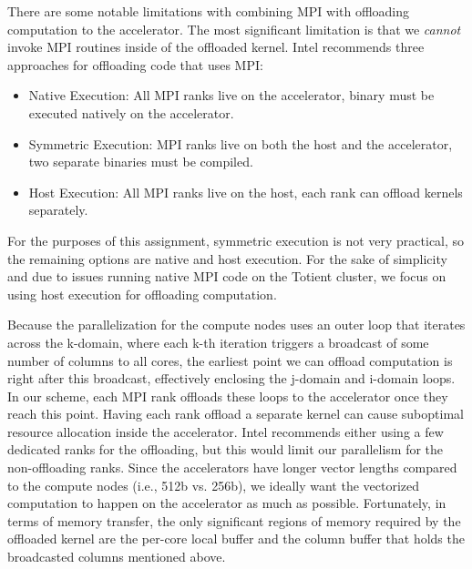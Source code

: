 There are some notable limitations with combining MPI with offloading
computation to the accelerator. The most significant limitation is that
we \emph{cannot} invoke MPI routines inside of the offloaded
kernel. Intel recommends three approaches for offloading code that uses
MPI:

\begin{itemize}
  \item Native Execution: All MPI ranks live on the accelerator, binary
    must be executed natively on the accelerator.
  \item Symmetric Execution: MPI ranks live on both the host and the
    accelerator, two separate binaries must be compiled.
  \item Host Execution: All MPI ranks live on the host, each rank can
    offload kernels separately.
\end{itemize}

For the purposes of this assignment, symmetric execution is not very
practical, so the remaining options are native and host execution. For
the sake of simplicity and due to issues running native MPI code on the
Totient cluster, we focus on using host execution for offloading
computation.

Because the parallelization for the compute nodes uses an outer loop that
iterates across the k-domain, where each k-th iteration triggers a
broadcast of some number of columns to all cores, the earliest point we
can offload computation is right after this broadcast, effectively
enclosing the j-domain and i-domain loops. In our scheme, each MPI rank
offloads these loops to the accelerator once they reach this
point. Having each rank offload a separate kernel can cause suboptimal
resource allocation inside the accelerator. Intel recommends either using
a few dedicated ranks for the offloading, but this would limit our
parallelism for the non-offloading ranks. Since the accelerators have
longer vector lengths compared to the compute nodes (i.e., 512b
vs. 256b), we ideally want the vectorized computation to happen on the
accelerator as much as possible. Fortunately, in terms of memory
transfer, the only significant regions of memory required by the
offloaded kernel are the per-core local buffer and the column buffer that
holds the broadcasted columns mentioned above.

